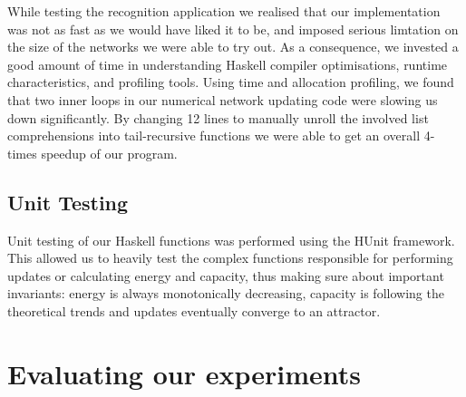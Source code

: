 While testing the recognition application we realised that our implementation was not as fast as we would have liked it to be, and imposed serious limtation on the size of the networks we were able to try out.
As a consequence, we invested a good amount of time in understanding Haskell compiler optimisations, runtime characteristics, and profiling tools. Using time and allocation profiling, we found that two inner loops in our numerical network updating code were slowing us down significantly. By changing 12 lines to manually unroll the involved list comprehensions into tail-recursive functions we were able to get an overall 4-times speedup of our program.



\subsection{Unit Testing}

Unit testing of our Haskell functions was performed using the HUnit framework. This allowed us to heavily test the complex functions responsible for performing updates or calculating energy and capacity, thus making sure about important invariants: energy is always monotonically decreasing, capacity is following the theoretical trends and updates eventually converge to an attractor. 


\section{Evaluating our experiments}

